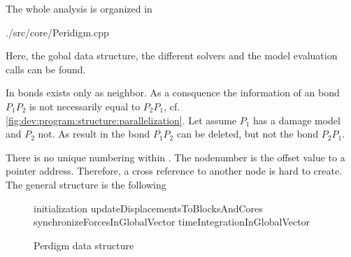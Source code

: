 % 
%               
%          
% 

The whole analysis is organized in 

\begingroup
\lstset{breaklines=true}
\begin{code}
./src/core/Peridigm.cpp
\end{code}
\endgroup

Here, the gobal data structure, the different solvers and the model evaluation calls can be found.


In \toolname{} bonds exists only as neighbor. As a consquence the information of an bond $P_1P_2$ is not necessarily equal to $P_2P_1$, cf. \autoref{fig:dev:program:structure:parallelization}. Let assume $P_1$ has a damage model and $P_2$ not. As result in \toolname{} the bond $P_1P_2$ can be deleted, but not the bond $P_2P_1$. 


There is no unique numbering within \toolname. The nodenumber is the offset value to a pointer address. Therefore, a cross reference to another node is hard to create. The general structure is the following

\begin{figure}[htbp]
	  \centering
\begin{minipage}{8cm}
\begin{algorithm}[H]
 initialization\;
 updateDisplacementsToBlocksAndCores\;
 synchronizeForcesInGlobalVector\;
 timeIntegrationInGlobalVector\;
  \caption{Perdigm data structure}\label{fig:PerdigmDataStructure}
\end{algorithm}
\end{minipage}
\end{figure}

